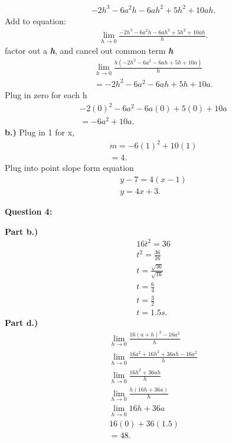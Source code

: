 \documentclass{report}
\begin{document}
    \begin{align*}
        -2h^3-6a^2h-6ah^2+5h^2+10ah
    .\end{align*}
    \bigbreak \noindent 
    Add to equation:
    \begin{align*}
        \lim\limits_{h \to 0}{ \frac{-2h^3-6a^2h-6ah^2+5h^2+10ah}{h}}
    .\end{align*}
    \bigbreak \noindent 
    factor out a \textbf{\textit{h}}, and cancel out common term \textbf{\textit{h}}
    \begin{align*}
        \lim\limits_{h \to 0}{ \frac{h \left(-2h^2-6a^2-6ah+5h+10a\right)}{h}} \\
        =-2h^2-6a^2-6ah+5h+10a 
    .\end{align*}
    \bigbreak \noindent 
    Plug in zero for each h
    \begin{align*}
        -2 \left(0\right)^2-6a^2-6a \left(0\right) + 5 \left(0\right)+10a \\
        = -6a^2+10a
    .\end{align*}
    \bigbreak \noindent \bigbreak \noindent 
    \textbf{b.)}
    Plug in 1 for x,
    \begin{align*}
        m = -6 \left(1\right)^2 + 10 \left(1\right) \\ 
        = 4
    .\end{align*}
    \bigbreak \noindent 
    Plug into point slope form equation 
    \begin{align*}
        y - 7 = 4 \left(x - 1\right) \\ 
        y = 4x+3
    .\end{align*}

    \bigbreak \noindent \bigbreak \noindent \bigbreak \noindent 
    \begin{Large}
       \textbf{Question 4:}
    \end{Large}
    \bigbreak \noindent 
    \bigbreak \noindent 
    \textbf{Part b.)} 
    \begin{align*}
        16t^2 = 36 \\ 
         t^2 = \frac{36}{16} \\ 
         t = \frac{ \sqrt{36}}{ \sqrt{16}} \\
         t = \frac{6}{4} \\ 
         t = \frac{3}{2} \\
         t = 1.5 s 
    .\end{align*}
    \bigbreak \noindent 
    \textbf{Part d.)}
    \begin{align*}
        \lim\limits_{h \to 0}{ \frac{16 (a+h)^2 - 16a^2}{h}} \\ 
        \lim\limits_{h \to 0}{ \frac{16a^2+16h^2+36ah-16a^2}{h}} \\
        \lim\limits_{h \to 0}{ \frac{16h^2+36ah}{h}} \\
        \lim\limits_{h \to 0}{ \frac{h (16h+36a)}{h}} \\ 
        \lim\limits_{h \to 0}{16h+36a} \\
        16(0) + 36(1.5) \\
        = 48
    .\end{align*}
\end{document}
